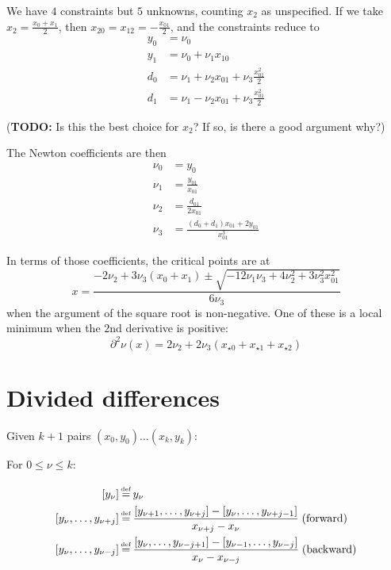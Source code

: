 We have $4$ constraints but $5$ unknowns, counting $x_2$
as unspecified.
If we take $x_2 = \frac{x_0 + x_1}{2}$,
then $x_{20} = x_{12} = -\frac{x_{01}}{2}$,
and the constraints reduce to
\begin{align}
y_0 & = \nu_0 
\\
y_1 & = \nu_0 + \nu_1 x_{10}  
\nonumber 
\\
d_0 & = \nu_1 + \nu_2 x_{01} + \nu_3 \frac{x_{01}^2}{2} 
\\
d_1 & = \nu_1 - \nu_2 x_{01} + \nu_3 \frac{x_{01}^2}{2} 
\nonumber
\end{align}

(\textbf{TODO:} Is this the best choice for $x_2$? 
If so, is there a good argument why?)

The Newton coefficients are then
\begin{align}
\nu_0 & = y_0 
\\
\nu_1 & = \frac{y_{01}}{x_{01}}
\nonumber
\\ 
\nu_2 & = \frac{d_{01}}{2 x_{01}}
\nonumber
\\ 
\nu_3 & = \frac{ \left(d_0 + d_1 \right) x_{01} + 2 y_{01}}{x_{01}^3}
\nonumber
\end{align} 

In terms of those coefficients, the critical points are at
\begin{equation}
x=\frac{-2 \nu_2 + 3 \nu_3 \left( x_0 + x_1 \right) 
\pm \sqrt{-12 \nu_1 \nu_3 + 4 \nu_2^{2} + 3 \nu_3^{2} x_{01}^{2}}
}
{ 6 \nu_3}
\end{equation}
when the argument of the square root is non-negative.
One of these is a local minimum when the $2$nd derivative is positive:
\begin{equation}
\partial^2 \nu(x) = 2\nu_2
 + 2 \nu_3 \left(x_{{\star}0} + x_{{\star}1} + x_{{\star}2}\right)
\end{equation}

\newpage
\section{Divided differences}\label{sec:Divided-differences}
 \cite{wiki:Divided-differences}
Given $k+1$ pairs 
$\left( x_0, y_0 \right) \ldots \left( x_k, y_k \right) $:

For $0 \leq \nu \leq k$:

\begin{align}
\left[ y_{\nu} \right] & \operatorname*{\overset{\underset{\mathrm{def}}{}}{=}} y_{\nu}
\\
\left[ y_{\nu}, \ldots , y_{\nu + j} \right] & \operatorname*{\overset{\underset{\mathrm{def}}{}}{=}} 
\frac{
\left[ y_{\nu + 1}, \ldots ,  y_{\nu + j} \right]
-
\left[ y_{\nu}, \ldots ,  y_{\nu + j - 1} \right]
}{
x_{\nu + j} - x_{\nu}
} 
\; \text{(forward)}
\nonumber
\\
\left[ y_{\nu}, \ldots , y_{\nu - j} \right] & \operatorname*{\overset{\underset{\mathrm{def}}{}}{=}} 
\frac{
\left[ y_{\nu}, \ldots ,  y_{\nu - j + 1} \right]
-
\left[ y_{\nu - 1}, \ldots ,  y_{\nu - j} \right]
}{
x_{\nu} - x_{\nu - j}
} 
\; \text{(backward)}
\nonumber
\end{align}

